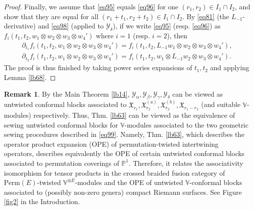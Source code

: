 \documentclass[12pt,a4paper,notitlepage]{article}
\theoremstyle{definition}
\newtheorem{rem}[df]{Remark}
\theoremstyle{plain}
\newcommand{\fk}{\mathfrak}
\newcommand{\mc}{\mathcal}
\newcommand{\Vbb}{\mathbb V}
\newcommand{\Pbb}{\mathbb P}
\newcommand{\Perm}{\mathrm{Perm}}
\numberwithin{equation}{subsection}
\begin{document}
\begin{proof}
Finally, we assume that \eqref{eq95} equals \eqref{eq96} for one $(r_1,r_2)\in I_1\cap I_2$, and show that they are equal for all $(r_1+t_1,r_2+t_2)\in I_1\cap I_2$. By \eqref{eq81}  (the $L_{-1}$-derivative) and \eqref{eq98} (applied to $\mc Y_\delta$), if we write \eqref{eq95} (resp. \eqref{eq96})  as $f_i(t_1,t_2,w_1\otimes w_2\otimes w_3\otimes w_4')$ where $i=1$ (resp. $i=2$), then 
\begin{gather*}
\partial_{t_1}f_i(t_1,t_2,w_1\otimes w_2\otimes w_3\otimes w_4')=f_i(t_1,t_2,L_{-1}w_1\otimes w_2\otimes w_3\otimes w_4'),\\
\partial_{t_2}f_i(t_1,t_2,w_1\otimes w_2\otimes w_3\otimes w_4')=f_i(t_1,t_2,w_1\otimes L_{-1}w_2\otimes w_3\otimes w_4').	
\end{gather*}
The proof is thus finished by taking power series expansions of $t_1,t_2$ and applying Lemma \ref{lb68}.
\end{proof}








\begin{rem}
By the Main Theorem \ref{lb14}, $\mc Y_\alpha,\mc Y_\beta,\mc Y_\gamma,\mc Y_\delta$ can be viewed as untwisted conformal blocks associated to $\fk X_{r_1},\fk X_{r_2}^{(a)},\fk X_{r_2}^{(b)},\fk X_{r_1-r_2}$ (and suitable $\Vbb$-modules) respectively. Thus, Thm. \ref{lb63} can be viewed as the equivalence of sewing untwisted conformal blocks for $\Vbb$-modules associated to the two geometric sewing procedures described in \eqref{eq99}. Namely, Thm. \ref{lb63}, which describes the operator product expansion (OPE) of permutation-twisted intertwining operators, describes equivalently the OPE of certain untwisted conformal blocks associated to permutation coverings of $\Pbb^1$. Therefore, it relates the associativity isomorphism for tensor products in the crossed braided fusion category of  $\Perm(E)$-twisted $\Vbb^{\otimes E}$-modules and the OPE of untwisted $\Vbb$-conformal blocks associated to (possibly non-zero genera) compact Riemann surfaces. See Figure \ref{fig2} in the Introduction.
\end{rem}
\end{document}
